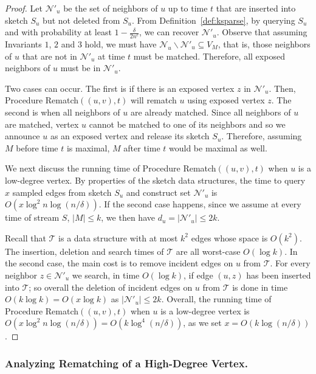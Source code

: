 \documentclass[11pt,letter]{article}
\begin{document}
\begin{proof}
Let $\mathcal{N}'_u$ be the set of neighbors of $u$ up to time $t$
that are inserted into sketch $S_u$ but not deleted from $S_u$.
From Definition~\ref{def:ksparse},
by querying $S_u$ and with probability at least
$1-\frac{\delta}{2n^c}$, we can recover $\mathcal{N}'_u$.
Observe that assuming Invariants $1$, $2$ and $3$ hold, we must have
$\mathcal{N}_u \backslash \mathcal{N}'_u \subseteq V_M$, that is, those neighbors of
$u$ that are not in $\mathcal{N}'_u$ at time $t$ must be matched.
Therefore, all exposed neighbors of $u$ must be in $\mathcal{N}'_u$.

Two cases can occur. The first is if there is an exposed vertex $z$ in $\mathcal{N}'_u$.
Then, Procedure {\sf Rematch$((u,v),t)$} will rematch $u$ using exposed vertex $z$.
The second is when all neighbors of $u$ are already matched. Since all neighbors of $u$
are matched, vertex $u$ cannot be matched to one of its neighbors and
so we announce $u$ as an exposed vertex and release its sketch $S_u$.
Therefore, assuming $M$ before time $t$ is maximal, $M$ after time $t$
would be maximal as well.

We next discuss the running time of Procedure {\sf Rematch$((u,v),t)$}
when $u$ is a low-degree vertex.
By properties of the sketch data structures,
the time to query $x$ sampled edges from sketch $S_u$ and construct set
$\mathcal{N}'_u$ is $O(x\log^2 n\log(n/\delta))$.
If the second case happens, since we assume at every time of stream $S$, $|M|\le k$,
we then have $d_u=|\mathcal{N}'_u|\le 2k$.

Recall that $\mathcal{T}$ is a data structure with at most $k^2$ edges
whose space is $O(k^2)$. The insertion, deletion and
search times of $\mathcal{T}$ are all worst-case $O(\log k)$.
In the second case, the main cost is to remove incident edges
on $u$ from $\mathcal{T}$.
For every neighbor $z\in \mathcal{N}'_u$ we search, in time $O(\log k)$,
if edge $(u,z)$ has been inserted into $\mathcal{T}$; so overall the deletion of incident
edges on $u$ from $\mathcal{T}$ is done in time $O(k\log k)=O(x\log k)$
as $|\mathcal{N}'_u|\le 2k$. Overall, the running time of Procedure {\sf Rematch$((u,v),t)$}
when $u$ is a low-degree vertex is $O(x\log^2
n\log(n/\delta))=O(k\log^4(n/\delta))$, as we set $x = O(k \log (n/\delta))$.
\end{proof}





\subsubsection{Analyzing Rematching of a High-Degree Vertex.}
\end{document}
